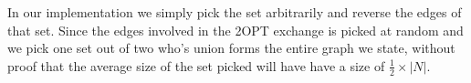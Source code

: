 \documentclass[a4paper,12pt,oneside]{article}
\begin{document}
In our implementation we simply pick the set arbitrarily and reverse the edges of that set. Since the edges involved in the 2OPT exchange is picked at random and we pick one set out of two who's union forms the entire graph we state, without proof that the average size of the set picked will have have a size of $\frac{1}{2} \times |N|$.



\begin{thebibliography}{9}

\end{thebibliography}
\end{document}
